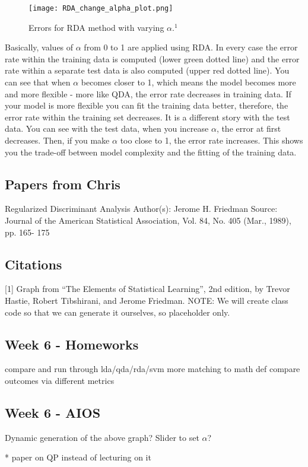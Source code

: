 \documentclass[a4paper]{article}
\begin{document}
\begin{figure}[H]
\center
\texttt{[image: RDA\_change\_alpha\_plot.png]}
\caption{Errors for RDA method with varying $\alpha$.$^{1}$}
\label{dharmaweb1}
\end{figure}

Basically, values of $\alpha$ from 0 to 1 are applied using RDA. In every case the error rate within the training data is computed (lower green dotted line) and the error rate within a separate test data is also computed (upper red dotted line). You can see that when $\alpha$ becomes closer to 1, which means the model becomes more and more flexible - more like QDA, the error rate decreases in training data. If your model is more flexible you can fit the training data better, therefore, the error rate within the training set decreases. It is a different story with the test data. You can see with the test data, when you increase $\alpha$,  the error at first decreases. Then, if you make $\alpha$ too close to 1, the error rate increases. This shows you the trade-off between model complexity and the fitting of the training data.


\subsection{Papers from Chris}
Regularized Discriminant Analysis Author(s): Jerome H. Friedman
Source: Journal of the American Statistical Association, Vol. 84, No. 405 (Mar., 1989), pp. 165- 175


\subsection{Citations}
[1] Graph from ``The Elements of Statistical Learning'', 2nd edition, by Trevor Hastie, Robert Tibshirani, and Jerome Friedman. NOTE: We will create  class code so that we can generate it ourselves, so placeholder only.


\subsection{Week 6 - Homeworks}
compare and run through lda/qda/rda/svm
more matching to math def
compare outcomes via different metrics

\subsection{Week 6 - AIOS}
Dynamic generation of the above graph? Slider to set $\alpha$?

* paper on QP instead of lecturing on it
\end{document}
